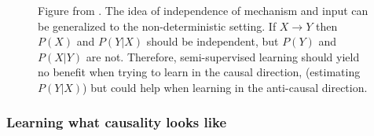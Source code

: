 \documentclass[a0,landscape,25pt,plainsections]{sciposter}
\begin{document}
\begin{multicols}{5}
\begin{figure}
{}
\end{figure}

\begin{figure}
\centering
\caption{Figure from {\cite{Scholkopf2012}}. The idea of independence of mechanism and input can be generalized to the non-deterministic setting. If $X \rightarrow Y$ then $P(X)$ and $P(Y|X)$ should be independent, but $P(Y)$ and $P(X|Y)$ are not. Therefore, semi-supervised learning should yield no benefit when trying to learn in the causal direction, (estimating $P(Y|X)$) but could help when learning in the anti-causal direction.}
{}
\end{figure}

\subsubsection*{Learning what causality looks like {\cite{LopezPaz2014}}}


\end{multicols}
\end{document}
